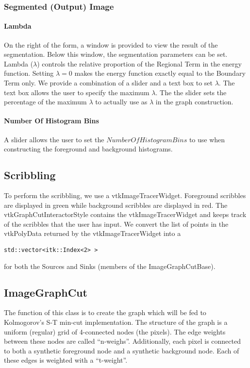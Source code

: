 \documentclass{InsightArticle}
\begin{document}
\subsubsection{Segmented (Output) Image}
\paragraph{Lambda}
On the right of the form, a window is provided to view the result of the segmentation. Below this window, the segmentation parameters can be set. Lambda ($\lambda$) controls the relative proportion of the Regional Term in the energy function. Setting $\lambda = 0$ makes the energy function exactly equal to the Boundary Term only. We provide a combination of a slider and a text box to set $\lambda$. The text box allows the user to specify the maximum $\lambda$. The the slider sets the percentage of the maximum $\lambda$ to actually use as $\lambda$ in the graph construction.

\paragraph{Number Of Histogram Bins}
A slider allows the user to set the $NumberOfHistogramBins$ to use when constructing the foreground and background histograms.

\subsection{Scribbling}
To perform the scribbling, we use a vtkImageTracerWidget. Foreground scribbles are displayed in green while background scribbles are displayed in red. The vtkGraphCutInteractorStyle contains the vtkImageTracerWidget and keeps track of the scribbles that the user has input. We convert the list of points in the vtkPolyData returned by the vtkImageTracerWidget into a
\begin{verbatim}
std::vector<itk::Index<2> > 
\end{verbatim}

for both the Sources and Sinks (members of the ImageGraphCutBase).

\subsection{ImageGraphCut}
The function of this class is to create the graph which will be fed to Kolmogorov's S-T min-cut implementation. The structure of the graph is a uniform (regular) grid of 4-connected nodes (the pixels). The edge weights between these nodes are called ``n-weighs''.  Additionally, each pixel is connected to both a synthetic foreground node and a synthetic background node. Each of these edges is weighted with a ``t-weight''.
\end{document}
